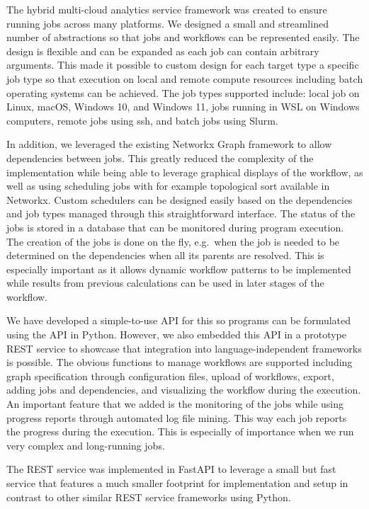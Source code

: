 The hybrid multi-cloud analytics service framework was created to ensure
running jobs across many platforms. We designed a small and streamlined
number of abstractions so that jobs and workflows can be represented
easily. The design is flexible and can be expanded as each job can
contain arbitrary arguments. This made it possible to custom design for
each target type a specific job type so that execution on local and
remote compute resources including batch operating systems can be
achieved. The job types supported include: local job on Linux, macOS,
Windows 10, and Windows 11, jobs running in WSL on Windows computers,
remote jobs using ssh, and batch jobs using Slurm.

In addition, we leveraged the existing Networkx Graph framework to allow
dependencies between jobs. This greatly reduced the complexity of the
implementation while being able to leverage graphical displays of the
workflow, as well as using scheduling jobs with for example topological
sort available in Networkx. Custom schedulers can be designed easily
based on the dependencies and job types managed through this
straightforward interface. The status of the jobs is stored in a
database that can be monitored during program execution. The creation of
the jobs is done on the fly, e.g.~when the job is needed to be
determined on the dependencies when all its parents are resolved. This
is especially important as it allows dynamic workflow patterns to be
implemented while results from previous calculations can be used in
later stages of the workflow.

We have developed a simple-to-use API for this so programs can be
formulated using the API in Python. However, we also embedded this API
in a prototype REST service to showcase that integration into
language-independent frameworks is possible. The obvious functions to
manage workflows are supported including graph specification through
configuration files, upload of workflows, export, adding jobs and
dependencies, and visualizing the workflow during the execution. An
important feature that we added is the monitoring of the jobs while
using progress reports through automated log file mining. This way each
job reports the progress during the execution. This is especially of
importance when we run very complex and long-running jobs.

The REST service was implemented in FastAPI to leverage a small but fast
service that features a much smaller footprint for implementation and
setup in contrast to other similar REST service frameworks using Python.

